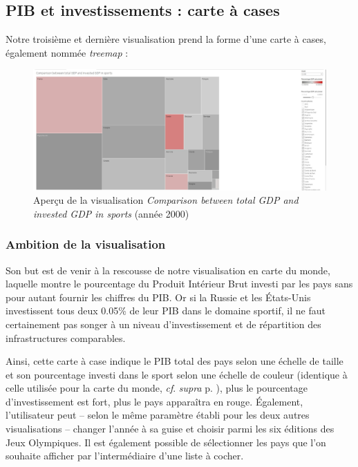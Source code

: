 \documentclass[hidelinks, 12pt]{report}
\begin{document}
%





\subsection{PIB et investissements : carte à cases}

Notre troisième et dernière visualisation prend la forme d'une carte à cases, également nommée \textit{treemap} :

\begin{center}
	\begin{figure}[H]
		\centering
		\setlength{\belowcaptionskip}{-35pt}
		\includegraphics[scale=0.25]{images/datavis-medals-world-treemap.jpeg}
		\captionsetup{justification=centering}
		\caption{Aperçu de la visualisation \textit{Comparison between total GDP and invested GDP in sports} (année 2000)}
	\end{figure}
\end{center}

\subsubsection{Ambition de la visualisation}

Son but est de venir à la rescousse de notre visualisation en carte du monde, laquelle montre le pourcentage du Produit Intérieur Brut investi par les pays sans pour autant fournir les chiffres du PIB. Or si la Russie et les États-Unis investissent tous deux 0.05\% de leur PIB dans le domaine sportif, il ne faut certainement pas songer à un niveau d'investissement et de répartition des infrastructures comparables.

Ainsi, cette carte à case indique le PIB total des pays selon une échelle de taille et son pourcentage investi dans le sport selon une échelle de couleur (identique à celle utilisée pour la carte du monde, \textit{cf}. \textit{supra} p. \pageref{color}), plus le pourcentage d'investissement est fort, plus le pays apparaîtra en rouge. Également, l'utilisateur peut -- selon le même paramètre établi pour les deux autres visualisations -- changer l'année à sa guise et choisir parmi les six éditions des Jeux Olympiques. Il est également possible de sélectionner les pays que l'on souhaite afficher par l'intermédiaire d'une liste à cocher.
\end{document}

